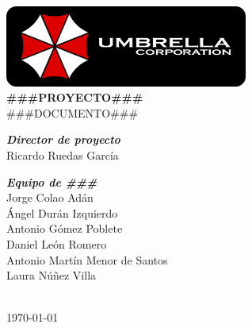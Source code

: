 \documentclass[a4paper,11pt,oneside]{article}
\begin{document}
\renewcommand\listtablename{Índice de tablas}
\renewcommand\tablename{Tabla}

\pagestyle{plain}



\begin{titlepage}
\begin{center}

\includegraphics[width=0.6\textwidth]{logo-umbrella.png}\\[4cm]

{\huge \textbf{\#\#\#PROYECTO\#\#\#}}\\[0.5cm]
{\huge {\#\#\#DOCUMENTO\#\#\#}}\\[4cm]

\begin{minipage}{0.5\textwidth}
\large
\hspace{1cm}\textbf{\emph{Director de proyecto}}\\
Ricardo Ruedas García\\
\end{minipage}

\begin{minipage}{0.5\textwidth}
\large
\hspace{1cm}\textbf{\emph{Equipo de \#\#\#}}\\
Jorge Colao Adán\\
Ángel Durán Izquierdo\\
Antonio Gómez Poblete\\
Daniel León Romero\\
Antonio Martín Menor de Santos\\
Laura Núñez Villa\\
\end{minipage}\\[2cm]

{\Large \today}
\end{center}
\end{titlepage}


\clearpage
{}
\setcounter{page}{2}

\tableofcontents

\clearpage

\pagestyle{fancy}









\end{document}
